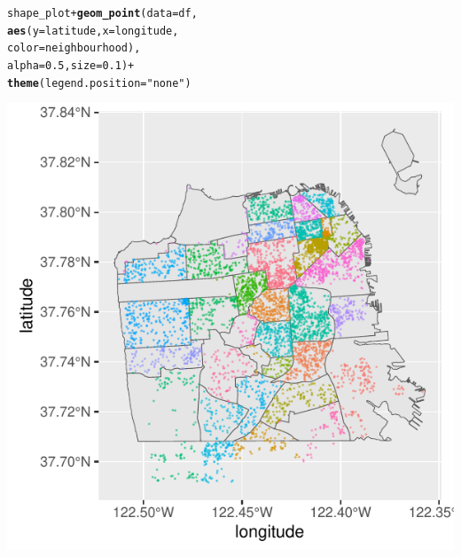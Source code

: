 \documentclass[a4paper, justified]{tufte-handout}\usepackage[]{graphicx}\usepackage[]{xcolor}
\makeatletter
\def\maxwidth{ %
  \ifdim\Gin@nat@width>\linewidth
    \linewidth
  \else
    \Gin@nat@width
  \fi
}
\newcommand{\hlnum}[1]{\textcolor[rgb]{0.686,0.059,0.569}{#1}}%
\newcommand{\hlstr}[1]{\textcolor[rgb]{0.192,0.494,0.8}{#1}}%
\newcommand{\hlopt}[1]{\textcolor[rgb]{0,0,0}{#1}}%
\newcommand{\hlstd}[1]{\textcolor[rgb]{0.345,0.345,0.345}{#1}}%
\newcommand{\hlkwc}[1]{\textcolor[rgb]{0.333,0.667,0.333}{#1}}%
\newcommand{\hlkwd}[1]{\textcolor[rgb]{0.737,0.353,0.396}{\textbf{#1}}}%
\newenvironment{kframe}{%
 \def\at@end@of@kframe{}%
 \ifinner\ifhmode%
  \def\at@end@of@kframe{\end{minipage}}%
  \begin{minipage}{\columnwidth}%
 \fi\fi%
 \def\FrameCommand##1{\hskip\@totalleftmargin \hskip-\fboxsep
 \colorbox{shadecolor}{##1}\hskip-\fboxsep
     \hskip-\linewidth \hskip-\@totalleftmargin \hskip\columnwidth}%
 \MakeFramed {\advance\hsize-\width
   \@totalleftmargin\z@ \linewidth\hsize
   \@setminipage}}%
 {\par\unskip\endMakeFramed%
 \at@end@of@kframe}
\newenvironment{knitrout}{}{} %
\makeatother
\begin{document}
\begin{knitrout}
\color{fgcolor}\begin{kframe}
\begin{alltt}
\hlstd{shape_plot} \hlopt{+} \hlkwd{geom_point}\hlstd{(}\hlkwc{data} \hlstd{= df,}
    \hlkwd{aes}\hlstd{(}\hlkwc{y} \hlstd{= latitude,} \hlkwc{x} \hlstd{= longitude,}
        \hlkwc{color} \hlstd{= neighbourhood),}
    \hlkwc{alpha} \hlstd{=} \hlnum{0.5}\hlstd{,} \hlkwc{size} \hlstd{=} \hlnum{0.1}\hlstd{)} \hlopt{+}
    \hlkwd{theme}\hlstd{(}\hlkwc{legend.position} \hlstd{=} \hlstr{"none"}\hlstd{)}
\end{alltt}
\end{kframe}\begin{marginfigure}
\includegraphics[width=\maxwidth]{figure/chunk-plotNeighbs-1} \end{marginfigure}


\end{knitrout}
\end{document}
